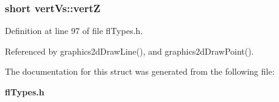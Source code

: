 \subsubsection{\setlength{\rightskip}{0pt plus 5cm}short {\bf vert\-Vs::vert\-Z}}\label{structvertVs_10306d61b6bb251637ae91db314644da}




Definition at line 97 of file fl\-Types.h.

Referenced by graphics2d\-Draw\-Line(), and graphics2d\-Draw\-Point().

The documentation for this struct was generated from the following file:\begin{CompactItemize}
\item 
{\bf fl\-Types.h}\end{CompactItemize}

